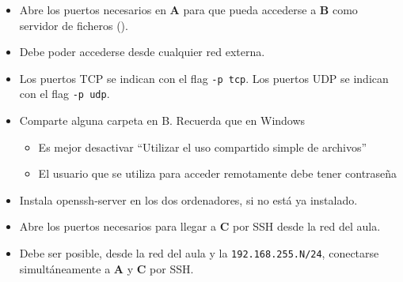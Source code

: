 \begin{homeworkProblem}
  \begin{itemize}
  \item Abre los puertos necesarios en \textbf{A} para que pueda accederse a \textbf{B} como servidor de ficheros ().
  \item Debe poder accederse desde cualquier red externa.
  \item  Los puertos TCP se indican con el flag \texttt{-p tcp}. Los puertos UDP se indican con el flag \texttt{-p udp}.
    
  \item Comparte alguna carpeta en B. Recuerda que en Windows
    \begin{itemize}
    \item Es mejor desactivar “Utilizar el uso compartido simple de archivos”
    \item El usuario que se utiliza para acceder remotamente debe tener contraseña
    \end{itemize}

  \end{itemize}

\end{homeworkProblem}


\begin{homeworkProblem}
  \begin{itemize}
  \item Instala openssh-server en los dos ordenadores, si no está ya instalado.
  \item Abre los puertos necesarios para llegar a \textbf{C} por SSH desde la red del aula.
    
  \item Debe ser posible, desde la red del aula y la \texttt{192.168.255.N/24}, conectarse simultáneamente a \textbf{A} y \textbf{C} por SSH.
  \end{itemize}
\end{homeworkProblem}


